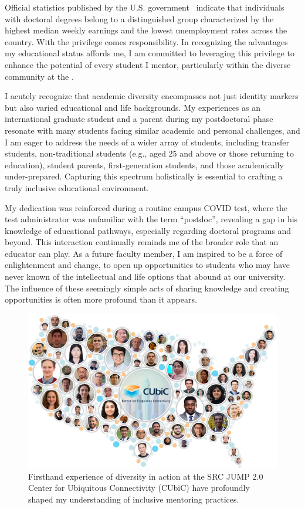 Official statistics published by the U.S. government~\cite{EducationPaysBureau} indicate that individuals with doctoral degrees belong to a distinguished group characterized by the highest median weekly earnings and the lowest unemployment rates across the country. With the privilege comes responsibility. In recognizing the advantages my educational status affords me, I am committed to leveraging this privilege to enhance the potential of every student I mentor, particularly within the diverse community at the \appSchool{}.

I acutely recognize that academic diversity encompasses not just identity markers but also varied educational and life backgrounds. My experiences as an international graduate student and a parent during my postdoctoral phase resonate with many students facing similar academic and personal challenges, and I am eager to address the needs of a wider array of students, including transfer students, non-traditional students (e.g., aged 25 and above or those returning to education), student parents, first-generation students, and those academically under-prepared. Capturing this spectrum holistically is essential to crafting a truly inclusive educational environment.


My dedication was reinforced during a routine campus COVID test, where the test administrator was unfamiliar with the term ``postdoc'', revealing a gap in his knowledge of educational pathways, especially regarding doctoral programs and beyond. This interaction continually reminds me of the broader role that an educator can play. As a future faculty member, I am inspired to be a force of enlightenment and change, to open up opportunities to students who may have never known of the intellectual and life options that abound at our university. The influence of these seemingly simple acts of sharing knowledge and creating opportunities is often more profound than it appears.

\begin{figure}[!ht]
    \centering
    \includegraphics[width=0.5\linewidth]{../../fig/diversity.pdf}
    \caption{Firsthand experience of diversity in action at the SRC JUMP 2.0 Center for Ubiquitous Connectivity (CUbiC) have profoundly shaped my understanding of inclusive mentoring practices.}
    \label{fig:diversity}
\end{figure}


